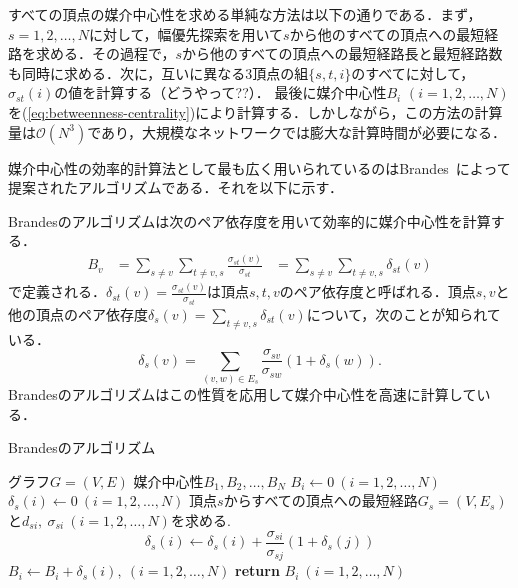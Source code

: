すべての頂点の媒介中心性を求める単純な方法は以下の通りである．まず，$s=1,2,\ldots,N$に対して，幅優先探索を用いて$s$から他のすべての頂点への最短経路を求める．その過程で，$s$から他のすべての頂点への最短経路長と最短経路数も同時に求める．次に，互いに異なる3頂点の組$\{s,t,i\}$のすべてに対して，$\sigma_{st}(i)$の値を計算する（どうやって??）．
最後に媒介中心性$B_i$ $(i=1,2,\ldots,N)$を(\ref{eq:betweenness-centrality})により計算する．しかしながら，この方法の計算量は$\mathcal{O}(N^3)$であり，大規模なネットワークでは膨大な計算時間が必要になる．

媒介中心性の効率的計算法として最も広く用いられているのはBrandes~\cite{Brandes2001}によって提案されたアルゴリズムである．それを以下に示す．

Brandesのアルゴリズムは次のペア依存度を用いて効率的に媒介中心性を計算する．
\begin{equation*}
  \begin{aligned}
    B_v&=\sum_{s\neq v}\sum_{t\neq v,s}\frac{\sigma_{st}(v)}{\sigma_{st}}
    &=\sum_{s\neq v}\sum_{t\neq v,s}\delta_{st}(v)
  \end{aligned}
\end{equation*}
で定義される．$\delta_{st}(v)=\frac{\sigma_{st}(v)}{\sigma_{st}}$は頂点$s,t,v$のペア依存度と呼ばれる．頂点$s,v$と他の頂点のペア依存度$\delta_{s}(v)=\sum_{t\neq v,s}\delta_{st}(v)$について，次のことが知られている．
\begin{equation*}
  \delta_{s}(v)=\sum_{(v,w)\in E_s}\frac{\sigma_{sv}}{\sigma_{sw}}(1+\delta_{s}(w)).
\end{equation*}
Brandesのアルゴリズムはこの性質を応用して媒介中心性を高速に計算している．

\begin{algorithm}
  \caption{Brandesのアルゴリズム}
  \label{algo:Brandes}
  \begin{algorithmic}[1]
    \Require グラフ$G=(V,E)$
    \Ensure 媒介中心性$B_1,B_2,\ldots,B_N$
    \State $B_i\gets0\ (i=1,2,\ldots,N)$
    \State $\delta_s(i)\gets0\ (i=1,2,\ldots,N)$
    \State 頂点$s$からすべての頂点への最短経路$G_s=(V,E_s)$と$d_{si},\ \sigma_{si}\ (i=1,2,\ldots,N)$を求める. 
    \State \begin{equation*} \delta_s(i)\gets\delta_s(i)+\frac{\sigma_{si}}{\sigma_{sj}}(1+\delta_s(j)) \end{equation*}
    \EndFor
    \State $B_i\gets B_i+\delta_s(i),\ (i=1,2,\ldots,N)$
    \EndFor
    \State \textbf{return} $B_i\ (i=1,2,\ldots,N)$
  \end{algorithmic}
\end{algorithm}


